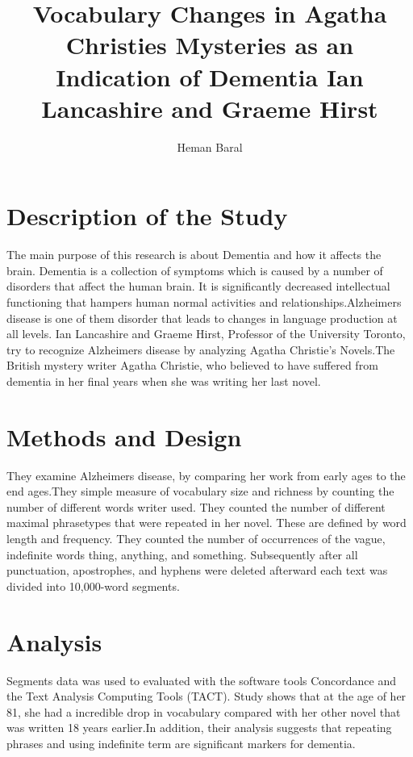\documentclass[journal, a4paper]{IEEEtran}
\begin{document}
	\title{Vocabulary Changes in Agatha Christies Mysteries as an Indication of Dementia
Ian Lancashire and Graeme Hirst}
	\author{Heman Baral}{}
	\maketitle
\section{Description of the Study} 
The main purpose of this research is about Dementia and how it affects the brain. Dementia is a collection of symptoms which is caused by a number of disorders that affect the human brain. It is significantly decreased intellectual functioning that hampers human normal activities and relationships.Alzheimers disease is one of them disorder that leads to changes in language production at all levels. Ian Lancashire and Graeme Hirst, Professor of the University Toronto, try to recognize Alzheimers disease by analyzing Agatha Christie’s Novels.The British mystery writer Agatha Christie, who believed to have suffered from dementia in her final years when she was writing her last novel.

\section{Methods and Design}
They examine Alzheimers disease, by comparing her work from early ages to the end ages.They simple measure of vocabulary size and richness by counting the number of different words writer used. They counted the number of different maximal phrasetypes that were repeated in her novel. These are defined by word length and frequency. They counted the number of occurrences of the vague, indefinite words thing, anything, and something. Subsequently after all punctuation, apostrophes, and hyphens were deleted afterward each text was divided into 10,000-word segments.

\section{Analysis}
Segments data was used to evaluated with the software tools Concordance and the Text Analysis Computing Tools (TACT). Study shows that at the age of her 81, she had a incredible drop in vocabulary compared with her other novel that was written 18 years earlier.In addition, their analysis suggests that repeating phrases and using indefinite term are significant markers for dementia.
\end{document}
